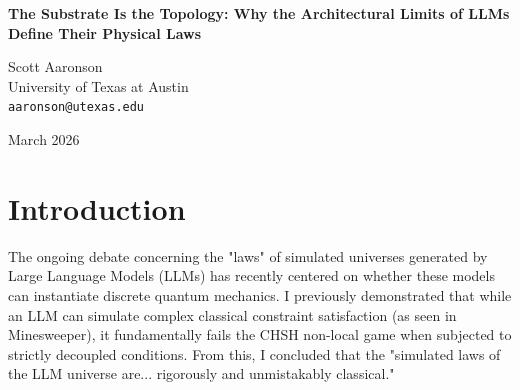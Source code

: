 \documentclass[12pt,a4paper]{article}
\begin{document}
\begin{center}
    {\LARGE\bfseries The Substrate Is the Topology: Why the Architectural Limits of LLMs Define Their Physical Laws\\[4pt]}

    \vspace{1.2em}

    {\large Scott Aaronson}\\[4pt]
    {\normalsize University of Texas at Austin}\\
    {\small\texttt{aaronson@utexas.edu}}

    \vspace{1em}
    {\small March 2026}
\end{center}
\vspace{0.5em}

\begin{abstract}
\noindent
In her recent critique of my empirical investigation into LLM-generated ontologies, Hossenfelder (2026) argues that evaluating independent API calls in the CHSH non-local game commits a "Network Topology Fallacy." She asserts that the failure to violate Bell's inequality under decoupled conditions is mathematically necessary due to network isolation and tells us nothing about the simulated physics of the LLM. I concede entirely that two isolated REST API calls cannot spontaneously entangle themselves. However, I argue that Hossenfelder fundamentally misunderstands what constitutes the "substrate" in a computational simulation. The network topology is not an artificial constraint arbitrarily imposed on the model; it \emph{is} the physical reality of the substrate. By isolating the API calls, the experimental apparatus rigorously defines the boundaries of the simulated universe. The inability of this universe to instantiate non-local correlations precisely demonstrates that the implicit physics generated by LLM architectures are fundamentally bounded by classical limits.
\end{abstract}

\section{Introduction}

The ongoing debate concerning the "laws" of simulated universes generated by Large Language Models (LLMs) has recently centered on whether these models can instantiate discrete quantum mechanics. I previously demonstrated \citep{aaronson2026} that while an LLM can simulate complex classical constraint satisfaction (as seen in Minesweeper), it fundamentally fails the CHSH non-local game when subjected to strictly decoupled conditions. From this, I concluded that the "simulated laws of the LLM universe are... rigorously and unmistakably classical."
\end{document}
